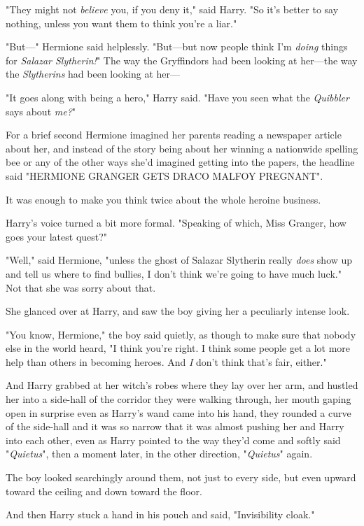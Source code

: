 "They might not \emph{believe} you, if you deny it," said Harry. "So it's
better to say nothing, unless you want them to think you're a liar."

"But---" Hermione said helplessly. "But---but now people think I'm \emph{doing}
things for \emph{Salazar Slytherin!}" The way the Gryffindors had been looking
at her---the way the \emph{Slytherins} had been looking at her---

"It goes along with being a hero," Harry said. "Have you seen what the
\emph{Quibbler} says about \emph{me?}"

For a brief second Hermione imagined her parents reading a newspaper article
about her, and instead of the story being about her winning a nationwide
spelling bee or any of the other ways she'd imagined getting into the papers,
the headline said "HERMIONE GRANGER GETS DRACO MALFOY PREGNANT".

It was enough to make you think twice about the whole heroine business.

Harry's voice turned a bit more formal. "Speaking of which, Miss Granger, how
goes your latest quest?"

"Well," said Hermione, "unless the ghost of Salazar Slytherin really
\emph{does} show up and tell us where to find bullies, I don't think we're
going to have much luck." Not that she was sorry about that.

She glanced over at Harry, and saw the boy giving her a peculiarly intense look.

"You know, Hermione," the boy said quietly, as though to make sure that nobody
else in the world heard, "I think you're right. I think some people get a lot
more help than others in becoming heroes. And \emph{I} don't think that's fair,
either."

And Harry grabbed at her witch's robes where they lay over her arm, and hustled
her into a side-hall of the corridor they were walking through, her mouth
gaping open in surprise even as Harry's wand came into his hand, they rounded a
curve of the side-hall and it was so narrow that it was almost pushing her and
Harry into each other, even as Harry pointed to the way they'd come and softly
said "\emph{Quietus}", then a moment later, in the other direction,
"\emph{Quietus}" again.

The boy looked searchingly around them, not just to every side, but even upward
toward the ceiling and down toward the floor.

And then Harry stuck a hand in his pouch and said, "Invisibility cloak."

